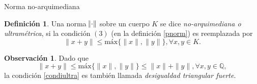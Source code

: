\documentclass{beamer}
\theoremstyle{definition}
\numberwithin{equation}{section}
\newcommand{\marine}[1]{\textcolor{defColor}{#1}}
\newcommand{\redd}[1]{\textcolor{rkColor}{#1}}
\newtheorem{df}{\marine{Definición}}
\newtheorem{rr}{\redd{Observación}}
\newcommand{\tit}[1]{\textit{#1}}
\renewcommand{\leq}{\leqslant}
\newcommand{\maxx}[1]{\text{m\'ax} #1}
\begin{document}
\begin{frame}{Norma no-arquimediana}
\begin{df}
	Una norma $\norm{\cdot}$ sobre un cuerpo $K$ se dice \textit{no-arquimediana o ultramétrica}, si la condición $ (3)$  (en la definición \ref{pnorm})  es reemplazada por
	\begin{equation}\label{condiultra}
	\|x+y\| \le \maxx\{\|x\|, \|y\|\}, \forall x,y\in K.
	\end{equation} 
\end{df}
\begin{rr}
	Dado que
	$$\|x+y\| \le \maxx\{\|x\|, \|y\|\} \leq \|x\| + \|y\|, \forall x,y\in \mathbb{Q},$$ 
	la condición \ref{condiultra} es también llamada \tit{desigualdad triangular  fuerte}.
\end{rr}
\end{frame}
\end{document}
